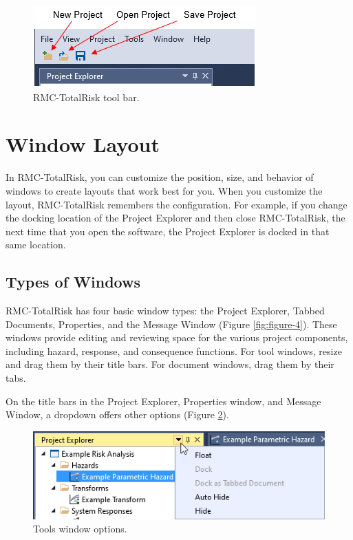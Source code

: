 \documentclass[
]{book}
\begin{document}
\begin{figure}

{\centering \includegraphics{images/figure17} 

}

\caption{RMC-TotalRisk tool bar.}\label{fig:figure-17}
\end{figure}

\hypertarget{gui-window-layout}{%
\section{Window Layout}\label{gui-window-layout}}

In RMC-TotalRisk, you can customize the position, size, and behavior of windows to create layouts that work best for you. When you customize the layout, RMC-TotalRisk remembers the configuration. For example, if you change the docking location of the Project Explorer and then close RMC-TotalRisk, the next time that you open the software, the Project Explorer is docked in that same location.

\hypertarget{types-of-windows}{%
\subsection{Types of Windows}\label{types-of-windows}}

RMC-TotalRisk has four basic window types: the Project Explorer, Tabbed Documents, Properties, and the Message Window (Figure \ref{fig:figure-4}). These windows provide editing and reviewing space for the various project components, including hazard, response, and consequence functions. For tool windows, resize and drag them by their title bars. For document windows, drag them by their tabs.

On the title bars in the Project Explorer, Properties window, and Message Window, a dropdown offers other options (Figure \ref{fig:figure-18}).

\begin{figure}

{\centering \includegraphics{images/figure18} 

}

\caption{Tools window options.}\label{fig:figure-18}
\end{figure}
\end{document}

